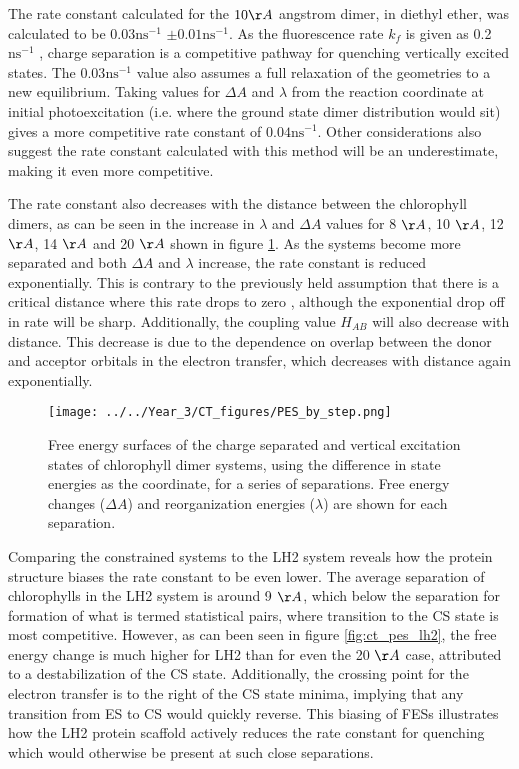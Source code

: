 The rate constant calculated for the $10\AA{}$ angstrom dimer, in diethyl ether,
was calculated to be $0.03 \text{ns}^{-1}$ $\pm 0.01 \text{ns}^{-1}$. As the fluorescence
rate $k_f$ is given as 0.2 $\text{ns}^{-1}$ \cite{Brody2002}, charge separation
is a competitive pathway for quenching vertically excited states. The $0.03 \text{ns}^{-1}$
value also assumes a full relaxation of the geometries to a new equilibrium. Taking
values for $\Delta A$ and $\lambda$ from the reaction coordinate at initial photoexcitation 
(i.e. where the ground state dimer distribution would sit) gives a more competitive 
rate constant of $0.04 \text{ns}^{-1}$. Other considerations also suggest the rate
constant calculated with this method will be an underestimate, making it even more competitive.

The rate constant also decreases with the distance between the chlorophyll dimers, as can
be seen in the increase in $\lambda$ and $\Delta A$ values for 8 $\AA{}$, 10 $\AA{}$,
12 $\AA{}$, 14 $\AA{}$ and 20 $\AA{}$ shown in figure \ref{fig:ct_pes_distance}. 
As the systems become more separated and both $\Delta A$ and $\lambda$ increase, 
the rate constant is reduced exponentially. This is contrary to the previously held
assumption that there is a critical distance where this rate drops to zero \cite{Beddard1976},
although the exponential drop off in rate will be sharp. Additionally, the coupling
value $H_{AB}$ will also decrease with distance. This decrease is due to the dependence 
on overlap between the donor and acceptor orbitals in the electron transfer, which 
decreases with distance again exponentially.

\begin{figure}
    \centering
    \texttt{[image: ../../Year\_3/CT\_figures/PES\_by\_step.png]}
    \caption{Free energy surfaces of the charge separated and vertical excitation
    states of chlorophyll dimer systems, using the difference in state energies 
    as the coordinate, for a series of separations. Free energy changes ($\Delta A$)
    and reorganization energies ($\lambda$) are shown for each separation.}
    \label{fig:ct_pes_distance}
\end{figure}

Comparing the constrained systems to the LH2 system reveals how the protein structure
biases the rate constant to be even lower. The average separation of chlorophylls
in the LH2 system is around 9 $\AA{}$, which below the separation for formation
of what is termed statistical pairs, where transition to the CS state is most competitive\cite{Beddard1976b}.
However, as can been seen in figure \ref{fig:ct_pes_lh2}, the free energy change
is much higher for LH2 than for even the 20 $\AA{}$ case, attributed to a destabilization
of the CS state. Additionally, the crossing point for the electron transfer is to
the right of the CS state minima, implying that any transition from ES to CS would
quickly reverse. This biasing of FESs illustrates how the LH2 protein scaffold actively
reduces the rate constant for quenching which would otherwise be present at such
close separations.

